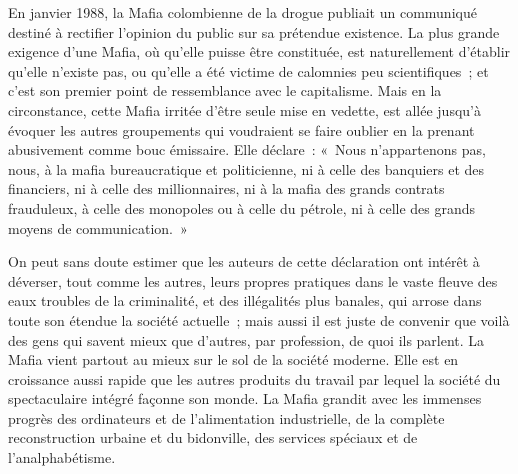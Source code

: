 \documentclass[french,twoside]{book} %
\def\bignobreak{\ifdim\lastskip<\bigskipamount
  \removelastskip\nopagebreak\bigskip\fi}
\newcommand{\labelblock}[1]{\bigbreak{\color{rubric}\noindent\textbf{#1}\par}\bignobreak}
\begin{document}
\noindent En janvier 1988, la Mafia colombienne de la drogue publiait un communiqué destiné à rectifier l’opinion du public sur sa prétendue existence. La plus grande exigence d’une Mafia, où qu’elle puisse être constituée, est naturellement d’établir qu’elle n’existe pas, ou qu’elle a été victime de calomnies peu scientifiques ; et c’est son premier point de ressemblance avec le capitalisme. Mais en la circonstance, cette Mafia irritée d’être seule mise en vedette, est allée jusqu’à évoquer les autres groupements qui voudraient se faire oublier en la prenant abusivement comme bouc émissaire. Elle déclare : « Nous n’appartenons pas, nous, à la mafia bureaucratique et politicienne, ni à celle des banquiers et des financiers, ni à celle des millionnaires, ni à la mafia des grands contrats frauduleux, à celle des monopoles ou à celle du pétrole, ni à celle des grands moyens de communication. »\par
On peut sans doute estimer que les auteurs de cette déclaration ont intérêt à déverser, tout comme les autres, leurs propres pratiques dans le vaste fleuve des eaux troubles de la criminalité, et des illégalités plus banales, qui arrose dans toute son étendue la société actuelle ; mais aussi il est juste de convenir que voilà des gens qui savent mieux que d’autres, par profession, de quoi ils parlent. La Mafia vient partout au mieux sur le sol de la société moderne. Elle est en croissance aussi rapide que les autres produits du travail par lequel la société du spectaculaire intégré façonne son monde. La Mafia grandit avec les immenses progrès des ordinateurs et de l’alimentation industrielle, de la complète reconstruction urbaine et du bidonville, des services spéciaux et de l’analphabétisme.\par

\labelblock{XXIV}
\end{document}

